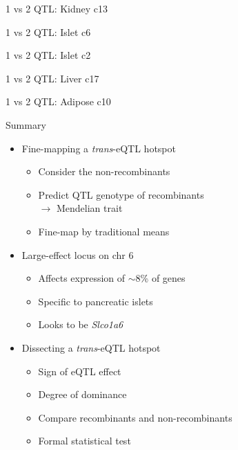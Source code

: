 \documentclass[12pt,t]{beamer}
\begin{document}
\begin{frame}[c]{1 vs 2 QTL: Kidney c13}

\note{
}

\end{frame}

\begin{frame}[c]{1 vs 2 QTL: Islet c6}

\note{
}

\end{frame}

\begin{frame}[c]{1 vs 2 QTL: Islet c2}

\note{
}

\end{frame}

\begin{frame}[c]{1 vs 2 QTL: Liver c17}

\note{
}

\end{frame}

\begin{frame}[c]{1 vs 2 QTL: Adipose c10}

\note{
}

\end{frame}


\begin{frame}[c]{Summary}
  \begin{itemize}
  \itemsep12pt
  \item Fine-mapping a \emph{trans}-eQTL hotspot
    \begin{itemize}
    \item Consider the non-recombinants
    \item Predict QTL genotype of recombinants \\
          $\longrightarrow$ Mendelian trait
    \item Fine-map by traditional means
    \end{itemize}
  \item Large-effect locus on chr 6
    \begin{itemize}
    \item Affects expression of $\sim$8\% of genes
    \item Specific to pancreatic islets
    \item Looks to be \emph{Slco1a6}
    \end{itemize}
  \item Dissecting a \emph{trans}-eQTL hotspot
    \begin{itemize}
    \item Sign of eQTL effect
    \item Degree of dominance
    \item Compare recombinants and non-recombinants
    \item Formal statistical test
    \end{itemize}
  \end{itemize}

\note{
}

\end{frame}
\end{document}
